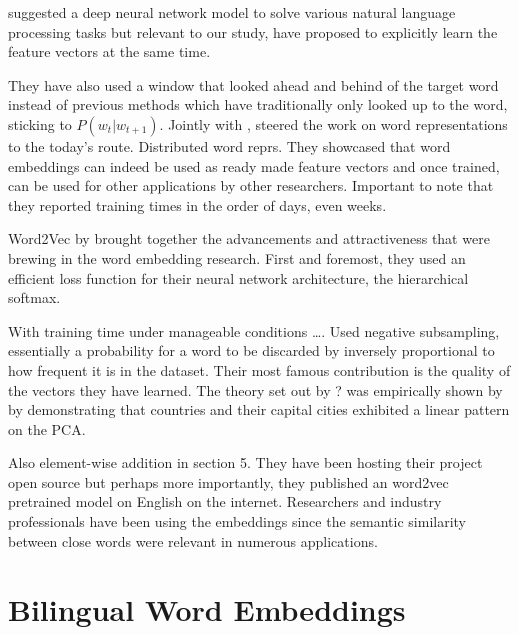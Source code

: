 \citeauthor{collobert_unified_2008} suggested a deep neural network model to solve various natural language processing tasks but relevant to our study, have proposed to explicitly learn the feature vectors at the same time.

They have also used a window that looked ahead and behind of the target word instead of previous methods which have traditionally only looked up to the word, sticking to $P(w_t | w_{t+1})$.
Jointly with \citeauthor{collobert_unified_2008}, \citeauthor{p._turian_word_2010} steered the work on word representations to the today's route.
Distributed word reprs.
They showcased that word embeddings can indeed be used as ready made feature vectors and once trained, can be used for other applications by other researchers.
Important to note that they reported training times in the order of days, even weeks.

Word2Vec by \textcite{mikolov_distributed_2013} brought together the advancements and attractiveness that were brewing in the word embedding research.
First and foremost, they used an efficient loss function for their neural network architecture, the hierarchical softmax. %

With training time under manageable conditions \ldots.
Used negative subsampling, essentially a probability for a word to be discarded by inversely proportional to how frequent it is in the dataset.
Their most famous contribution is the quality of the vectors they have learned.
The theory set out by ? was empirically shown by \citeauthor{mikolov_distributed_2013} by demonstrating that countries and their capital cities exhibited a linear pattern on the PCA.

Also element-wise addition in section 5.
They have been hosting their project open source but perhaps more importantly, they published an word2vec pretrained model on English on the internet.
Researchers and industry professionals have been using the embeddings since the semantic similarity between close words were relevant in numerous applications.

\section{Bilingual Word Embeddings}%
\label{sec:bilingual_word_embeddings}

